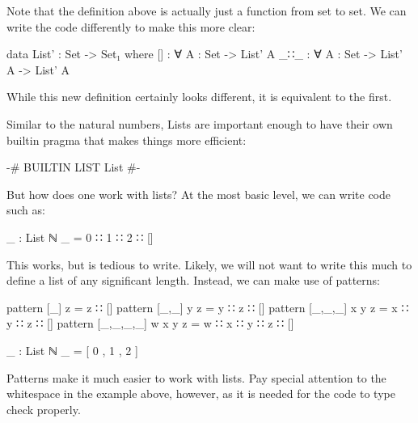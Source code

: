 \documentclass{lecturenotes}
\begin{document}
\vspace{0.2in}

Note that the definition above is actually just a function from set to set. 
We can write the code differently to make this more clear:

\begin{center}
    \begin{code}
        data List' : Set -> Set₁ where
            [] : ∀ {A : Set} -> List' A
            _∷_ : ∀ {A : Set} -> List' A -> List' A
    \end{code}
\end{center}

\noindent While this new definition certainly looks different, it is equivalent to the first. 

\vspace{0.2in}

Similar to the natural numbers, Lists are important enough to have their own builtin pragma that makes things more efficient:

\begin{center}
    \begin{code}
        {-# BUILTIN LIST List #-}
    \end{code}
\end{center}

But how does one work with lists?
At the most basic level, we can write code such as: 

\begin{center}
    \begin{code}
        _ : List ℕ
        _ = 0 ∷ 1 ∷ 2 ∷ []
    \end{code}
\end{center}

This works, but is tedious to write. 
Likely, we will not want to write this much to define a list of any significant length.
Instead, we can make use of patterns:

\begin{center}
    \begin{code}
        pattern [_] z = z ∷ []
        pattern [_,_] y z = y ∷ z ∷ []
        pattern [_,_,_] x y z = x ∷ y ∷ z ∷ []
        pattern [_,_,_,_] w x y z = w ∷ x ∷ y ∷ z ∷ []

        _ : List ℕ
        _ = [ 0 , 1 , 2 ]
    \end{code}
\end{center}

Patterns make it much easier to work with lists.
Pay special attention to the whitespace in the example above, however, as it is needed for the code to type check properly.
\end{document}
